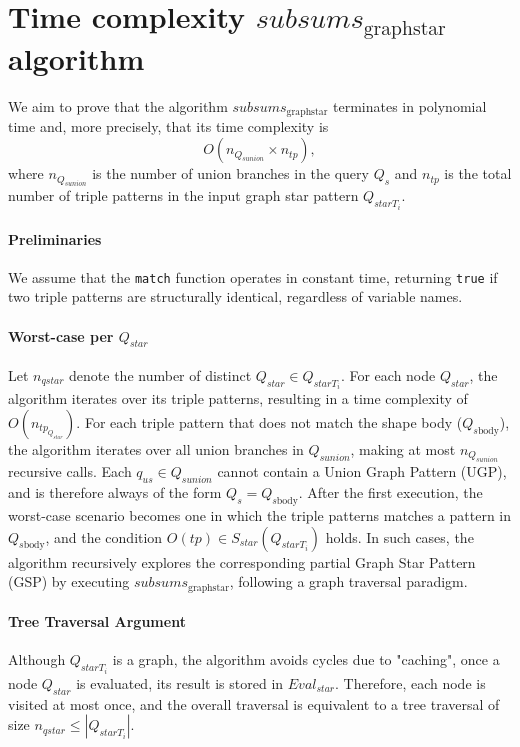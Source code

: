 \section{Time complexity $subsums_{\mathrm{graph star}}$ algorithm}




We aim to prove that the algorithm $subsums_{\mathrm{graph star}}$ terminates in polynomial time and, more precisely, that its time complexity is
\begin{equation}
O(n_{Q_{sunion}} \times n_{tp}),
\end{equation}
where $n_{Q_{sunion}}$ is the number of union branches in the query $Q_s$ and $n_{tp}$ is the total number of triple patterns in the input graph star pattern $Q_{starT_i}$.

\paragraph{Preliminaries}
We assume that the \texttt{match} function operates in constant time, returning \texttt{true} if two triple patterns are structurally identical, regardless of variable names.

\paragraph{Worst-case per $Q_{star}$}
Let $n_{qstar}$ denote the number of distinct $Q_{star} \in Q_{starT_i}$.
For each node $Q_{star}$, the algorithm iterates over its triple patterns, resulting in a time complexity of $O(n_{tp_{Q_{star}}})$.
For each triple pattern that does not match the shape body ($Q_{s\mathrm{body}}$), the algorithm iterates over all union branches in $Q_{sunion}$, making at most $n_{Q_{sunion}}$ recursive calls.
Each $q_{us} \in Q_{sunion}$ cannot contain a Union Graph Pattern (UGP), and is therefore always of the form $Q_s = Q_{s\mathrm{body}}$.
After the first execution, the worst-case scenario becomes one in which the triple patterns matches a pattern in $Q_{s\mathrm{body}}$, and the condition $O(tp) \in S_{star}(Q_{starT_i})$ holds.
In such cases, the algorithm recursively explores the corresponding partial Graph Star Pattern (GSP) by executing $subsums_{\mathrm{graph star}}$, following a graph traversal paradigm.


\paragraph{Tree Traversal Argument}
Although $Q_{starT_i}$ is a graph, the algorithm avoids cycles due to "caching", once a node $Q_{star}$ is evaluated, its result is stored in $Eval_{star}$.
Therefore, each node is visited at most once, and the overall traversal is equivalent to a tree traversal of size $n_{qstar} \leq |Q_{starT_i}|$.

